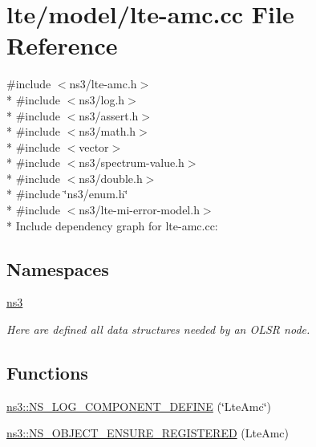 \hypertarget{lte-amc_8cc}{}\section{lte/model/lte-\/amc.cc File Reference}
\label{lte-amc_8cc}
{\ttfamily \#include $<$ns3/lte-\/amc.\+h$>$}\\*
{\ttfamily \#include $<$ns3/log.\+h$>$}\\*
{\ttfamily \#include $<$ns3/assert.\+h$>$}\\*
{\ttfamily \#include $<$ns3/math.\+h$>$}\\*
{\ttfamily \#include $<$vector$>$}\\*
{\ttfamily \#include $<$ns3/spectrum-\/value.\+h$>$}\\*
{\ttfamily \#include $<$ns3/double.\+h$>$}\\*
{\ttfamily \#include \char`\"{}ns3/enum.\+h\char`\"{}}\\*
{\ttfamily \#include $<$ns3/lte-\/mi-\/error-\/model.\+h$>$}\\*
Include dependency graph for lte-\/amc.cc\+:
\subsection*{Namespaces}
\begin{DoxyCompactItemize}
\item 
 \hyperlink{namespacens3}{ns3}
\begin{DoxyCompactList}\small\item\em Here are defined all data structures needed by an O\+L\+SR node. \end{DoxyCompactList}\end{DoxyCompactItemize}
\subsection*{Functions}
\begin{DoxyCompactItemize}
\item 
\hyperlink{namespacens3_a9301239d79235641dad647a7782f4952}{ns3\+::\+N\+S\+\_\+\+L\+O\+G\+\_\+\+C\+O\+M\+P\+O\+N\+E\+N\+T\+\_\+\+D\+E\+F\+I\+NE} (\char`\"{}Lte\+Amc\char`\"{})
\item 
\hyperlink{namespacens3_a5d67622498d9ea64a879d65c4e00abd4}{ns3\+::\+N\+S\+\_\+\+O\+B\+J\+E\+C\+T\+\_\+\+E\+N\+S\+U\+R\+E\+\_\+\+R\+E\+G\+I\+S\+T\+E\+R\+ED} (Lte\+Amc)
\end{DoxyCompactItemize}
